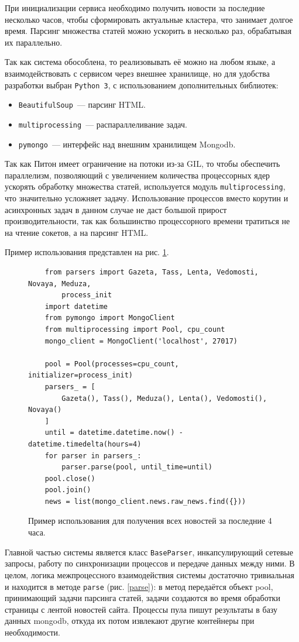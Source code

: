 \documentclass[a4paper, 14pt]{extarticle}
\begin{document}
При инициализации сервиса необходимо получить новости за последние несколько часов, чтобы сформировать актуальные кластера, что занимает долгое время. Парсинг множества статей можно ускорить в несколько раз, обрабатывая их параллельно.

Так как система обособлена, то реализовывать её можно на любом языке, а взаимодействовать с сервисом через внешнее хранилище, но для удобства разработки выбран \texttt{Python 3}, с использованием дополнительных библиотек: 
\begin{itemize}
	\item \texttt{BeautifulSoup}~--- парсинг HTML.
	\item \texttt{multiprocessing}~--- распараллеливание задач.
	\item \texttt{pymongo}~--- интерфейс над внешним хранилищем Mongodb.
\end{itemize}

Так как Питон имеет ограничение на потоки из-за GIL, то чтобы обеспечить параллелизм, позволяющий с увеличением количества процессорных ядер ускорять обработку множества статей, используется модуль \texttt{multiprocessing}, что значительно усложняет задачу. Использование процессов вместо корутин и асинхронных задач в данном случае не даст большой прирост производительности, так как большинство процессорного времени тратиться не на чтение сокетов, а на парсинг HTML. 

Пример использования представлен на рис. \ref{example}. 

\begin{figure}
	\centering
	\begin{verbatim}
	from parsers import Gazeta, Tass, Lenta, Vedomosti, Novaya, Meduza,
	    process_init
	import datetime
	from pymongo import MongoClient
	from multiprocessing import Pool, cpu_count
	mongo_client = MongoClient('localhost', 27017)
	
	pool = Pool(processes=cpu_count, initializer=process_init)
	parsers_ = [
	    Gazeta(), Tass(), Meduza(), Lenta(), Vedomosti(), Novaya()
	]
	until = datetime.datetime.now() - datetime.timedelta(hours=4)
	for parser in parsers_:
	    parser.parse(pool, until_time=until)
	pool.close()
	pool.join()
	news = list(mongo_client.news.raw_news.find({}))
	\end{verbatim}
	\caption{Пример использования для получения всех новостей за последние 4 часа.}
	\label{example}
\end{figure}

Главной частью системы является класс \texttt{BaseParser}, инкапсулирующий сетевые запросы, работу по синхронизации процессов и передаче данных между ними. В целом, логика межпроцессного взаимодействия системы достаточно тривиальная и находится в методе \texttt{parse} (рис. \ref{parse}): в метод передаётся объект pool, принимающий задачи парсинга статей, задачи создаются во время обработки страницы с лентой новостей сайта. Процессы пула пишут результаты в базу данных mongodb, откуда их потом извлекают другие контейнеры при необходимости. 
\end{document}
